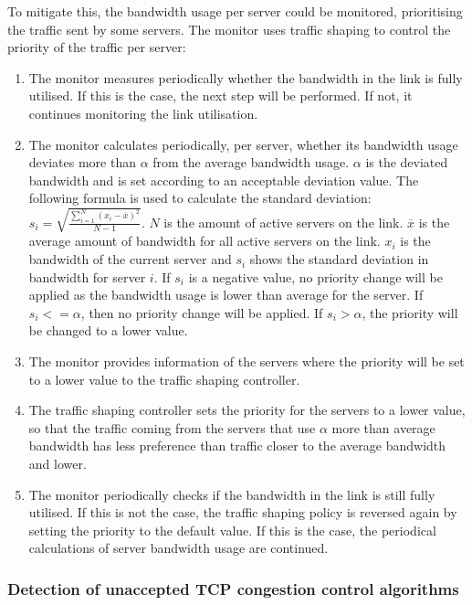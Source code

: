 \documentclass{article}
\begin{document}
To mitigate this, the bandwidth usage per server could be monitored, prioritising the traffic sent by some servers. The monitor uses traffic shaping to control the priority of the traffic per server:

\begin{enumerate}
	\item The monitor measures periodically whether the bandwidth in the link is fully utilised. If this is the case, the next step will be performed. If not, it continues monitoring the link utilisation.
	\item The monitor calculates periodically, per server, whether its bandwidth usage deviates more than $\alpha$ from the average bandwidth usage. $\alpha$ is the deviated bandwidth and is set according to an acceptable deviation value. The following formula is used to calculate the standard deviation: $s_{i} = \sqrt{\frac{\sum_{i=1}^N (x_i - \overline{x})^2}{N-1} }$. $N$ is the amount of active servers on the link. $\overline{x}$ is the average amount of bandwidth for all active servers on the link. $x_i$ is the bandwidth of the current server and $s_{i}$ shows the standard deviation in bandwidth for server $i$. If $s_{i}$ is a negative value, no priority change will be applied as the bandwidth usage is lower than average for the server. If $s_{i} <= \alpha$, then no priority change will be applied. If $s_{i} > \alpha$, the priority will be changed to a lower value.
	\item The monitor provides information of the servers where the priority will be set to a lower value to the traffic shaping controller.
	\item The traffic shaping controller sets the priority for the servers to a lower value, so that the traffic coming from the servers that use $\alpha$ more than average bandwidth has less preference than traffic closer to the average bandwidth and lower.
	\item The monitor periodically checks if the bandwidth in the link is still fully utilised. If this is not the case, the traffic shaping policy is reversed again by setting the priority to the default value. If this is the case, the periodical calculations of server bandwidth usage are continued.
\end{enumerate}

\subsubsection{Detection of unaccepted TCP congestion control algorithms}
\end{document}
